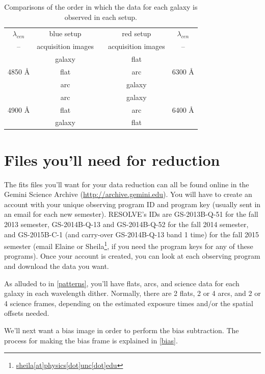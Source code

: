 \documentclass[12pt]{report}
\begin{document}
\begin{table}
\centering
\begin{tabular}[t]{|c|c|c|c|c|}
  \hline
$\lambda_{cen}$ & blue setup & & red setup & $\lambda_{cen}$ \\ \cline{1-2} \cline{4-5}
-- & acquisition images &  & acquisition images & -- \\ \cline{1-2} \cline{4-5}
& galaxy & & flat &\\ 
4850 \AA & flat & \parbox[t]{2mm}{}  & arc & 6300 \AA \\
& arc &  &  galaxy & \\  
& arc & & galaxy & \\
4900 \AA & flat & & arc & 6400 \AA \\
& galaxy & & flat & \\ \hline
\end{tabular}
\caption[Order of Observations]{Comparisons of the order in which the data for each galaxy is observed in each setup.}
\label{table:2}
\end{table}

\section{Files you'll need for reduction}
\label{files}

The fits files you'll want for your data reduction can all be found online in the Gemini Science Archive (\url{http://archive.gemini.edu}). You will have to create an account with your unique observing program ID and program key (usually sent in an email for each new semester). RESOLVE's IDs are GS-2013B-Q-51 for the fall 2013 semester, GS-2014B-Q-13 and GS-2014B-Q-52 for the fall 2014 semester, and GS-2015B-C-1 (and carry-over GS-2014B-Q-13 band 1 time) for the fall 2015 semester (email Elaine or Sheila\footnote{\url{sheila[at]physics[dot]unc[dot]edu}}, if you need the program keys for any of these programs). Once your account is created, you can look at each observing program and download the data you want.

As alluded to in \autoref{patterns}, you'll have flats, arcs, and science data for each galaxy in each wavelength dither. Normally, there are 2 flats, 2 or 4 arcs, and 2 or 4 science frames, depending on the estimated exposure times and/or the spatial offsets needed.

We'll next want a bias image in order to perform the bias subtraction.  The process for making the bias frame is explained in \autoref{bias}.
\end{document}
